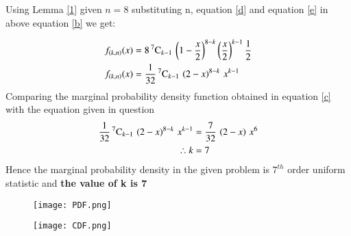 \documentclass[journal,12pt,twocolumn]{IEEEtran}
\begin{document}
Using Lemma \eqref{1} given $n=8$ substituting n, equation \eqref{d} and equation \eqref{e}  in above equation \eqref{b} we get:

\begin{align}
f_{(k,n)}(x) &= 8\,{}^{7}\mathrm{C}_{k-1}\,\left(1-\dfrac{x}{2}\right)^{8-k}\left(\dfrac{x}{2}\right)^{k-1} \dfrac{1}{2} \\
f_{(k,n)}(x) &= \dfrac{1}{32}\,{}^{7}\mathrm{C}_{k-1}\,\left(2-x\right)^{8-k}\,x^{k-1} \label{c} 
\end{align}
Comparing the marginal probability density function obtained in equation \eqref{c} with the equation given in question
\begin{align}
\dfrac{1}{32}\,{}^{7}\mathrm{C}_{k-1}\,\left(2-x\right)^{8-k}\,x^{k-1} &= \dfrac{7}{32}\,\left(2-x\right)\,x^6 \\
\therefore k &= 7 
\end{align}
Hence the marginal probability density in the given problem is $7^{th}$ order uniform statistic and \textbf{the value of k is 7}
\newpage
\begin{figure}[htp]
    \centering
    \texttt{[image: PDF.png]}
    \label{fig:PDF  of X}
\end{figure}
\begin{figure}[htp]
    \centering
    \texttt{[image: CDF.png]}
    \label{fig:CDF of X}
\end{figure}
\end{document}
